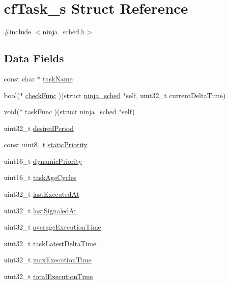 \hypertarget{structcfTask__s}{\section{cf\+Task\+\_\+s Struct Reference}
\label{structcfTask__s}
}


{\ttfamily \#include $<$ninja\+\_\+sched.\+h$>$}

\subsection*{Data Fields}
\begin{DoxyCompactItemize}
\item 
const char $\ast$ \hyperlink{structcfTask__s_ab9c9ba27f9fb1b72c98e44f995fb2e12}{task\+Name}
\item 
bool($\ast$ \hyperlink{structcfTask__s_a79e1d3beaa31d68bca80cb1057be23d5}{check\+Func} )(struct \hyperlink{structninja__sched}{ninja\+\_\+sched} $\ast$self, uint32\+\_\+t current\+Delta\+Time)
\item 
void($\ast$ \hyperlink{structcfTask__s_abebc1afeb90952b2f2f3965ae62e893e}{task\+Func} )(struct \hyperlink{structninja__sched}{ninja\+\_\+sched} $\ast$self)
\item 
uint32\+\_\+t \hyperlink{structcfTask__s_adb81d1a2c7487daeb00adefa272b3c67}{desired\+Period}
\item 
const uint8\+\_\+t \hyperlink{structcfTask__s_ac13ee939e38c25a4d55d9fa1ca91431b}{static\+Priority}
\item 
uint16\+\_\+t \hyperlink{structcfTask__s_a69a238e067da4f91c4d904903aded475}{dynamic\+Priority}
\item 
uint16\+\_\+t \hyperlink{structcfTask__s_ad7fc05ee0ef2f1c24aeffe48ecccba8b}{task\+Age\+Cycles}
\item 
uint32\+\_\+t \hyperlink{structcfTask__s_a15b9476e69707e50cb8aca4eaf4b99b3}{last\+Executed\+At}
\item 
uint32\+\_\+t \hyperlink{structcfTask__s_a7ee18c456eadd929d9408d7912301663}{last\+Signaled\+At}
\item 
uint32\+\_\+t \hyperlink{structcfTask__s_a132b3b610c2181dcb2583ab23330abda}{average\+Execution\+Time}
\item 
uint32\+\_\+t \hyperlink{structcfTask__s_a1646d4713287068c9c3dc139fa49c23f}{task\+Latest\+Delta\+Time}
\item 
uint32\+\_\+t \hyperlink{structcfTask__s_a45c57c3fd1504415d8fac7a8f5aa0f17}{max\+Execution\+Time}
\item 
uint32\+\_\+t \hyperlink{structcfTask__s_ab55f1d125ac2fd676608f6c4733eebe9}{total\+Execution\+Time}
\end{DoxyCompactItemize}


